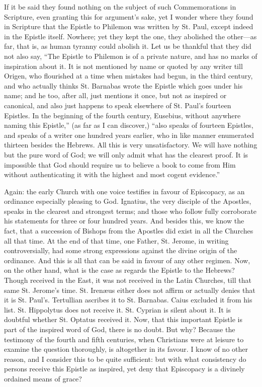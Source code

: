 If it be said they found nothing on the subject of such
Commemorations in Scripture, even granting this for argument's sake,
yet I wonder where they found in Scripture that the Epistle to
Philemon was written by St. Paul, except indeed in the Epistle itself.
Nowhere; yet they kept the one, they abolished the other—as
far, that is, as human tyranny could abolish it. Let us be thankful
that they did not also say, ``The Epistle to Philemon is of a
private nature, and has no marks of inspiration about it. It is not
mentioned by name or quoted by any writer till Origen, who flourished
at a time when mistakes had begun, in the third century, and who
actually thinks St. Barnabas wrote the Epistle which goes under his
name; and he too, after all, just mentions it once, but not as
inspired or canonical, and also just happens to speak elsewhere of St.
Paul's fourteen Epistles. In the beginning of the fourth century,
Eusebius, without anywhere naming this Epistle,'' (as far as I can
discover,) ``also speaks of fourteen Epistles, and speaks of a
writer one hundred years earlier, who in like manner enumerated
thirteen besides the Hebrews. All this is very unsatisfactory. We will
have nothing but the pure word of God; we will only admit what has the
clearest proof. It is impossible that God should require us to believe
a book to come from Him without authenticating it with the highest and
most cogent evidence.''

Again: the early Church with one voice testifies in favour of
Episcopacy, as an ordinance especially pleasing to God. Ignatius, the
very disciple of the Apostles, speaks in the clearest and strongest
terms; and those who follow fully corroborate his statements for three
or four hundred years. And besides this, we know the fact, that a
succession of Bishops from the Apostles did exist in all the Churches
all that time. At the end of that time, one Father, St. Jerome, in
writing controversially, had some strong expressions against the
divine origin of the ordinance. And this is all that can be said in
favour of any other regimen. Now, on the other hand, what is the case
as regards the Epistle to the Hebrews? Though received in the
East, it was not received in the Latin Churches, till that same St.
Jerome's time. St. Irenæus either does not affirm or actually denies
that it is St. Paul's. Tertullian ascribes it to St. Barnabas. Caius
excluded it from his list. St. Hippolytus does not receive it. St.
Cyprian is silent about it. It is doubtful whether St. Optatus
received it. Now, that this important Epistle is part of the inspired
word of God, there is no doubt. But why? Because the testimony of the
fourth and fifth centuries, when Christians were at leisure to examine
the question thoroughly, is altogether in its favour. I know of no
other reason, and I consider this to be quite sufficient: but with
what consistency do persons receive this Epistle as inspired, yet deny
that Episcopacy is a divinely ordained means of grace?

